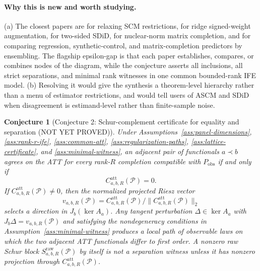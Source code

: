 \documentclass[11pt]{article}
\theoremstyle{definition}
\theoremstyle{plain}
\newtheorem{conjecture}{Conjecture}
\theoremstyle{remark}
\begin{document}
\paragraph{Why this is new and worth studying.}
(a) The closest papers are \citet{DoudchenkoImbens2016} for relaxing SCM restrictions, \citet{BenMichaelFellerRothstein2021} for ridge signed-weight augmentation, \citet{ArkhangelskyAtheyHirshbergImbensWager2021} for two-sided SDiD, \citet{AtheyBayatiDoudchenkoImbensKhosravi2021} for nuclear-norm matrix completion, and \citet{AtheyBayatiImbensQu2019} for comparing regression, synthetic-control, and matrix-completion predictors by ensembling. The flagship epsilon-gap is that each paper establishes, compares, or combines nodes of the diagram, while the conjecture asserts all inclusions, all strict separations, and minimal rank witnesses in one common bounded-rank IFE model. (b) Resolving it would give the \citet{DoudchenkoImbens2016} synthesis a theorem-level hierarchy rather than a menu of estimator restrictions, and would tell users of ASCM and SDiD when disagreement is estimand-level rather than finite-sample noise.

\begin{conjecture}[Conjecture 2: Schur-complement certificate for equality and separation (NOT YET PROVED)]\label{conj:certificate}
Under Assumptions~\ref{ass:panel-dimensions}, \ref{ass:rank-r-ife}, \ref{ass:common-att}, \ref{ass:regularization-paths}, \ref{ass:lattice-certificate}, and \ref{ass:minimal-witness}, an adjacent pair of functionals \(a\prec b\) agrees on the ATT for every rank-\(R\) completion compatible with \(P_{\mathrm{obs}}\) if and only if
\[
C^{\mathrm{att}}_{a,b,R}(\mathcal P)=0.
\]
If \(C^{\mathrm{att}}_{a,b,R}(\mathcal P)\ne0\), then the normalized projected Riesz vector
\[
v_{a,b,R}(\mathcal P)
=C^{\mathrm{att}}_{a,b,R}(\mathcal P)/
\|C^{\mathrm{att}}_{a,b,R}(\mathcal P)\|_2
\]
selects a direction in \(J_b(\ker A_a)\). Any tangent perturbation \(\Delta\in\ker A_a\) with \(J_b\Delta=v_{a,b,R}(\mathcal P)\) and satisfying the nondegeneracy conditions in Assumption~\ref{ass:minimal-witness} produces a local path of observable laws on which the two adjacent ATT functionals differ to first order. A nonzero raw Schur block \(S^{\mathrm{raw}}_{a,b,R}(\mathcal P)\) by itself is not a separation witness unless it has nonzero projection through \(C^{\mathrm{att}}_{a,b,R}(\mathcal P)\).
\end{conjecture}
\end{document}
